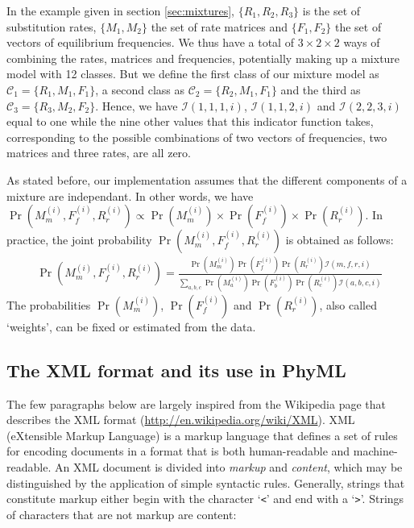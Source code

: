 \documentclass[a4paper,12pt]{article}
\newcommand{\x}[1]{\texttt{#1}}
\begin{document}
In the example given in section \ref{sec:mixtures}, $\{R_1,R_2,R_3\}$
is the  set of substitution  rates, $\{M_1,M_2\}$ the set of rate matrices and $\{F_1,F_2\}$ the set  of vectors of equilibrium frequencies.  We thus have a total of $3 \times 2 \times 2$ ways of combining the rates, matrices and frequencies, potentially making up a mixture model with 12 classes.
But we
define the first class of our mixture model  as $\mathcal{C}_1 = \{R_1,M_1,F_1\}$, a second class as
$\mathcal{C}_2  = \{R_2,M_1,F_1\}$ and the third as $\mathcal{C}_3  = \{R_3,M_2,F_2\}$. Hence, we
have $\mathcal{I}(1,1,1,i)$, $\mathcal{I}(1,1,2,i)$ and $\mathcal{I}(2,2,3,i)$ equal to one while
the nine other values that this indicator function takes, corresponding to the possible combinations of
two vectors of frequencies, two  matrices and three rates, are all zero.

As stated before, our implementation assumes that the different components of a mixture are
independant. In other words, we have $\Pr(M_m^{(i)},F_f^{(i)},R_r^{(i)}) \propto \Pr(M_m^{(i)}) \times
\Pr(F_f^{(i)}) \times \Pr(R_r^{(i)})$. In practice, the joint probability
$\Pr(M_m^{(i)},F_f^{(i)},R_r^{(i)})$ is obtained as follows:
\begin{eqnarray*}
\Pr(M_m^{(i)},F_f^{(i)},R_r^{(i)}) = \frac{\Pr(M_m^{(i)}) \Pr(F_f^{(i)}) \Pr(R_r^{(i)}) \mathcal{I}(m,f,r,i)}{
  \sum_{a,b,c} \Pr(M_a^{(i)}) \Pr(F_b^{(i)}) \Pr(R_c^{(i)}) \mathcal{I}(a,b,c,i)}
\label{equ:weights}
\end{eqnarray*}
The probabilities $\Pr(M_m^{(i)})$, $\Pr(F_f^{(i)})$ and $\Pr(R_r^{(i)})$, also called `weights', can be fixed or estimated
from the data.

\subsection{The XML format and its use in PhyML}\label{sec:XML format}

The few paragraphs below are largely inspired from  the Wikipedia page that describes the XML format
(\url{http://en.wikipedia.org/wiki/XML}). XML (eXtensible Markup Language) is a markup language that
defines  a set  of  rules  for encoding  documents  in  a format  that  is  both human-readable  and
machine-readable.  An  XML document is  divided into  {\em markup} and  {\em content}, which  may be
distinguished  by the  application of  simple syntactic  rules. Generally,  strings that  constitute
markup either begin  with the character `\x{<}' and  end with a `\x{>}'. Strings  of characters that
are not markup are content:
\end{document}
